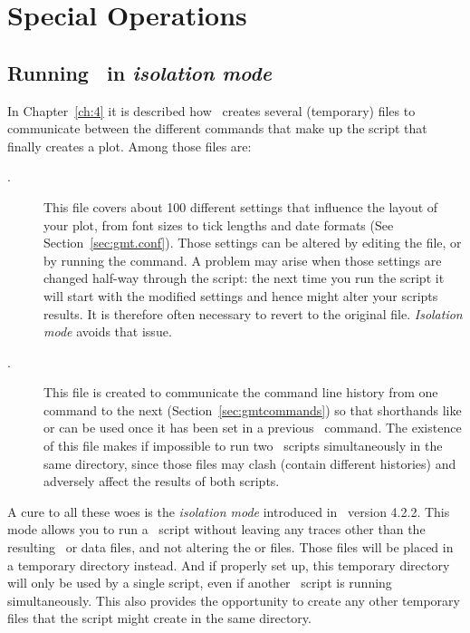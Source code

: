 %
%

\chapter{Special Operations}
\label{app:P}

\section{Running \gmt\ in \emph{isolation mode}}
\label{sec:isolationmode}
In Chapter~\ref{ch:4} it is described how \GMT\ creates several (temporary) files to
communicate between the different commands that make up the script that finally
creates a plot. Among those files are:
\begin{description}
\item[.] This file covers about 100 different settings
that influence the layout of your plot, from font sizes to tick lengths and
date formats (See Section~\ref{sec:gmt.conf}). Those settings can be altered
by editing the file, or by running the  command. A problem may
arise when those settings are changed half-way through the script: the next
time you run the script it will start with the modified settings and hence might
alter your scripts results. It is therefore often necessary to revert to the
original  file. \emph{Isolation mode} avoids that issue.
\item[.] This file is created to communicate the
command line history from one command to the next (Section~\ref{sec:gmtcommands})
so that shorthands like  or  can be used once it has been set in
a previous \GMT\ command.  The existence of this file makes if impossible to run
two \GMT\ scripts simultaneously in the same directory, since those 
files may clash (contain different histories) and adversely affect the results of both scripts.
\end{description}

A cure to all these woes is the \emph{isolation mode} introduced in \GMT\ version
4.2.2. This mode allows you to run a \GMT\ script without leaving any traces other
than the resulting \PS\  or data files, and not altering the 
or  files. Those files will be placed in a temporary directory
instead. And if properly set up, this temporary directory will only be used by a
single script, even if another \GMT\ script is running simultaneously. This also
provides the opportunity to create any other temporary files that the script might
create in the same directory.

